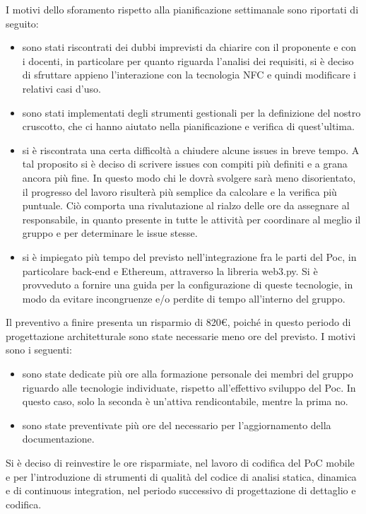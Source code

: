 I motivi dello sforamento rispetto alla pianificazione settimanale sono riportati di seguito:
\begin{itemize}
	\item sono stati riscontrati dei dubbi imprevisti da chiarire con il proponente e con i docenti, in particolare 
per quanto riguarda l'analisi dei requisiti, si è deciso di sfruttare appieno l'interazione con la tecnologia NFC e
quindi modificare i relativi casi d'uso.
\item sono stati implementati degli strumenti gestionali per la definizione del nostro cruscotto, che ci hanno aiutato nella pianificazione 
e verifica di quest'ultima. 
\item si è riscontrata una certa difficoltà a chiudere alcune issues in breve tempo. 
A tal proposito si è deciso di scrivere issues con compiti più definiti e
a grana ancora più fine. In questo modo 
chi le dovrà svolgere sarà meno disorientato, il progresso del lavoro risulterà più semplice da calcolare
e la verifica più puntuale. Ciò comporta una rivalutazione al rialzo delle ore da assegnare al responsabile, in quanto
presente in tutte le attività per coordinare al meglio il gruppo e per determinare le issue stesse.

\item si è impiegato più tempo del previsto nell'integrazione fra le parti del Poc, in particolare back-end e Ethereum, attraverso la libreria web3.py. Si è provveduto a fornire una guida per la configurazione di queste tecnologie, in modo da evitare incongruenze e/o perdite di tempo all'interno del gruppo.
\end{itemize}


Il preventivo a finire presenta un risparmio di 820\euro,
poiché in questo periodo di progettazione architetturale
sono state necessarie meno ore del previsto.
I motivi sono i seguenti:
\begin{itemize}
	\item sono state dedicate più ore alla formazione personale dei membri del gruppo riguardo alle tecnologie individuate,
	rispetto all'effettivo sviluppo del Poc. In questo caso, solo la seconda è un'attiva rendicontabile, mentre la prima no.
	\item sono state preventivate più ore del necessario per l'aggiornamento della documentazione.
\end{itemize}
Si è deciso di reinvestire le ore risparmiate, nel lavoro di codifica
del PoC mobile e per l'introduzione di strumenti di qualità del codice
di analisi statica, dinamica e di continuous integration, nel periodo successivo di progettazione di dettaglio e codifica.

